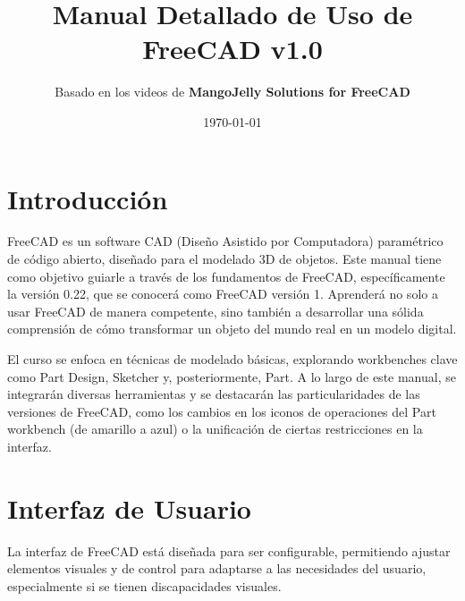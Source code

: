 \documentclass[12pt]{article}
\title{Manual Detallado de Uso de FreeCAD v1.0}
\author{Basado en los videos de \textbf{MangoJelly Solutions for FreeCAD}}
\date{\today}
\begin{document}
\maketitle
\tableofcontents
\newpage

\section{Introducción}
FreeCAD es un software CAD (Diseño Asistido por Computadora) paramétrico de código abierto, diseñado para el modelado 3D de objetos. Este manual tiene como objetivo guiarle a través de los fundamentos de FreeCAD, específicamente la versión 0.22, que se conocerá como FreeCAD versión 1. Aprenderá no solo a usar FreeCAD de manera competente, sino también a desarrollar una sólida comprensión de cómo transformar un objeto del mundo real en un modelo digital.

El curso se enfoca en técnicas de modelado básicas, explorando workbenches clave como Part Design, Sketcher y, posteriormente, Part. A lo largo de este manual, se integrarán diversas herramientas y se destacarán las particularidades de las versiones de FreeCAD, como los cambios en los iconos de operaciones del Part workbench (de amarillo a azul) o la unificación de ciertas restricciones en la interfaz.

\newpage

\section{Interfaz de Usuario}
La interfaz de FreeCAD está diseñada para ser configurable, permitiendo ajustar elementos visuales y de control para adaptarse a las necesidades del usuario, especialmente si se tienen discapacidades visuales.
\end{document}

